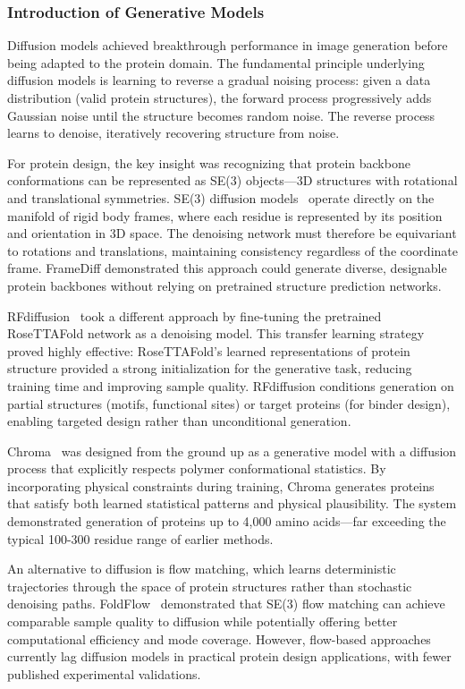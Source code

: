\subsubsection{Introduction of Generative Models}

Diffusion models achieved breakthrough performance in image generation before being adapted to the protein domain. The fundamental principle underlying diffusion models is learning to reverse a gradual noising process: given a data distribution (valid protein structures), the forward process progressively adds Gaussian noise until the structure becomes random noise. The reverse process learns to denoise, iteratively recovering structure from noise.

For protein design, the key insight was recognizing that protein backbone conformations can be represented as SE(3) objects---3D structures with rotational and translational symmetries. SE(3) diffusion models~\citep{yim2023se3diffusion} operate directly on the manifold of rigid body frames, where each residue is represented by its position and orientation in 3D space. The denoising network must therefore be equivariant to rotations and translations, maintaining consistency regardless of the coordinate frame. FrameDiff demonstrated this approach could generate diverse, designable protein backbones without relying on pretrained structure prediction networks.

RFdiffusion~\citep{watson2023rfdiffusion} took a different approach by fine-tuning the pretrained RoseTTAFold network as a denoising model. This transfer learning strategy proved highly effective: RoseTTAFold's learned representations of protein structure provided a strong initialization for the generative task, reducing training time and improving sample quality. RFdiffusion conditions generation on partial structures (motifs, functional sites) or target proteins (for binder design), enabling targeted design rather than unconditional generation.

Chroma~\citep{ingraham2023chroma} was designed from the ground up as a generative model with a diffusion process that explicitly respects polymer conformational statistics. By incorporating physical constraints during training, Chroma generates proteins that satisfy both learned statistical patterns and physical plausibility. The system demonstrated generation of proteins up to 4,000 amino acids---far exceeding the typical 100-300 residue range of earlier methods.

An alternative to diffusion is flow matching, which learns deterministic trajectories through the space of protein structures rather than stochastic denoising paths. FoldFlow~\citep{bose2023foldflow} demonstrated that SE(3) flow matching can achieve comparable sample quality to diffusion while potentially offering better computational efficiency and mode coverage. However, flow-based approaches currently lag diffusion models in practical protein design applications, with fewer published experimental validations.

